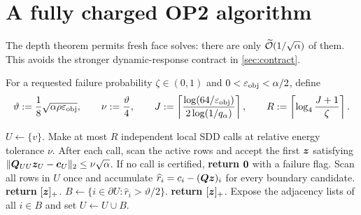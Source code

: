 \section{A fully charged OP2 algorithm}
\label{sec:op2-algorithm}

The depth theorem permits fresh face solves: there are only
$\widetilde{\mathcal{O}}(1/\sqrt\alpha)$ of them.  This avoids the stronger dynamic-response
contract in \cref{sec:contract}.

For a requested failure probability $\zeta\in(0,1)$ and
$0<\varepsilon_{\mathrm{obj}}<\alpha/2$, define
\begin{equation}
 \vartheta:=\frac18\sqrt{\alpha\rho\varepsilon_{\mathrm{obj}}},
 \qquad
 \nu:=\frac{\vartheta}{4},
 \qquad
 J:=\left\lceil
 \frac{\log(64/\varepsilon_{\mathrm{obj}})}{2\log(1/q_\alpha)}
 \right\rceil,
 \qquad
 R:=\left\lceil\log_4\frac{J+1}{\zeta}\right\rceil.
 \label{eq:op2-parameters}
\end{equation}

\begin{algorithm}[t]
\caption{Threshold-batch local RPPR obstacle solver}
\label{alg:threshold-batch}
\begin{algorithmic}[1]
\STATE $U\gets\{v\}$.
  \STATE Make at most $R$ independent local SDD calls at relative energy
         tolerance $\nu$.  After each call, scan the active rows and accept
         the first $\bm{z}$ satisfying
         $\lVert\bm{Q}_{UU}\bm{z}_U-\bm{c}_U\rVert_2\leq\nu\sqrt\alpha$.
  \STATE If no call is certified, \textbf{return} $\bm{0}$ with a failure flag.
  \STATE Scan all rows in $U$ once and accumulate
         $\widehat r_i=c_i-(\bm{Q}\bm{z})_i$ for every boundary candidate.
    \STATE \textbf{return} $[\bm{z}]_+$.
  \ENDIF
  \STATE $B\gets\{i\in\partial U:\widehat r_i>\vartheta/2\}$.
    \STATE \textbf{return} $[\bm{z}]_+$.
  \ENDIF
  \STATE Expose the adjacency lists of all $i\in B$ and set $U\gets U\cup B$.
\ENDFOR
\end{algorithmic}
\end{algorithm}

